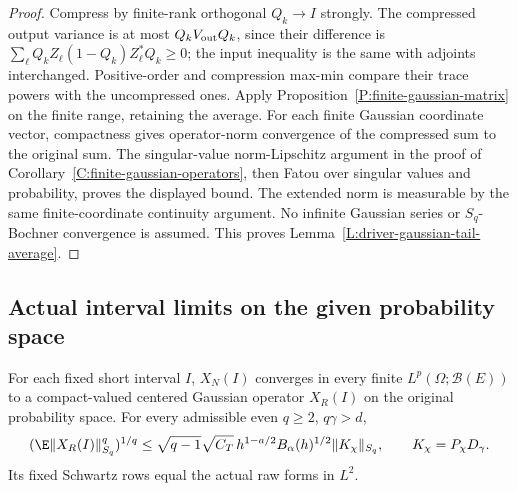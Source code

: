 \begin{proof}
  Compress by finite-rank orthogonal $Q_k\to I$ strongly. The compressed
  output variance is at most $Q_kV_{\rm out}Q_k$, since their difference
  is $\sum_\ell Q_kZ_\ell(1-Q_k)Z_\ell^*Q_k\ge0$; the input inequality
  is the same with adjoints interchanged. Positive-order and compression
  max-min compare their trace powers with the uncompressed ones.
  Apply Proposition~\ref{P:finite-gaussian-matrix} on the finite range,
  retaining the average. For each finite Gaussian coordinate vector,
  compactness gives operator-norm convergence of the compressed sum to
  the original sum. The singular-value norm-Lipschitz argument in the proof
  of Corollary~\ref{C:finite-gaussian-operators}, then Fatou over singular
  values and probability, proves the displayed bound. The extended norm
  is measurable by the same finite-coordinate continuity argument.
  No infinite Gaussian series or $S_q$-Bochner convergence is assumed.
  This proves Lemma~\ref{L:driver-gaussian-tail-average}.
\end{proof}

\subsection{Actual interval limits on the given probability space}

\begin{lemma}\label{L:driver-interval-limit}
  For each fixed short interval $I$, $X_N(I)$ converges in every finite
  $L^p(\Omega;\mathcal B(E))$ to a compact-valued centered Gaussian
  operator $X_R(I)$ on the original probability space. For every admissible
  even $q\ge2$, $q\gamma>d$,
  \begin{equation}\label{E:driver-fixed-schatten}
    (\E\|X_R(I)\|_{S_q}^q)^{1/q}
    \le\sqrt{q-1}\sqrt{C_T}\,h^{1-a/2}B_\alpha(h)^{1/2}
    \|K_\chi\|_{S_q},\qquad K_\chi=P_\chi D_\gamma.
  \end{equation}
  Its fixed Schwartz rows equal the actual raw forms in $L^2$.
\end{lemma}

